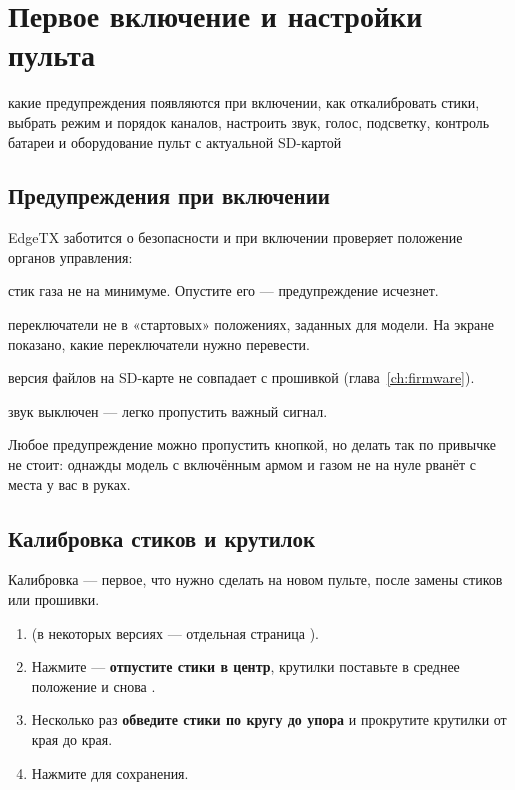 \chapter{Первое включение и настройки пульта}
\label{ch:radio}
\chapterintro
  {какие предупреждения появляются при включении, как откалибровать стики, выбрать режим и
   порядок каналов, настроить звук, голос, подсветку, контроль батареи и оборудование}
  {пульт с актуальной SD-картой}

\section{Предупреждения при включении}

EdgeTX заботится о безопасности и при включении проверяет положение органов управления:
\begin{description}[font=\sffamily\bfseries\color{etx}]
  \item[Throttle warning] стик газа не на минимуме. Опустите его --- предупреждение исчезнет.
  \item[Switch warning] переключатели не в «стартовых» положениях, заданных для модели.
        На экране показано, какие переключатели нужно перевести.
  \item[SD card / Storage warning] версия файлов на SD-карте не совпадает с прошивкой
        (глава~\ref{ch:firmware}).
  \item[Alarms disabled / Sound off] звук выключен --- легко пропустить важный сигнал.
\end{description}

Любое предупреждение можно пропустить кнопкой, но делать так по привычке не стоит: однажды
модель с включённым армом и газом не на нуле рванёт с места у вас в руках.

\section{Калибровка стиков и крутилок}

Калибровка --- первое, что нужно сделать на новом пульте, после замены стиков или прошивки.

\begin{enumerate}
  \item {} (в некоторых версиях --- отдельная страница
        ).
  \item Нажмите  --- \textbf{отпустите стики в центр}, крутилки поставьте в среднее
        положение и снова .
  \item Несколько раз \textbf{обведите стики по кругу до упора} и прокрутите крутилки
        от края до края.
  \item Нажмите  для сохранения.
\end{enumerate}

